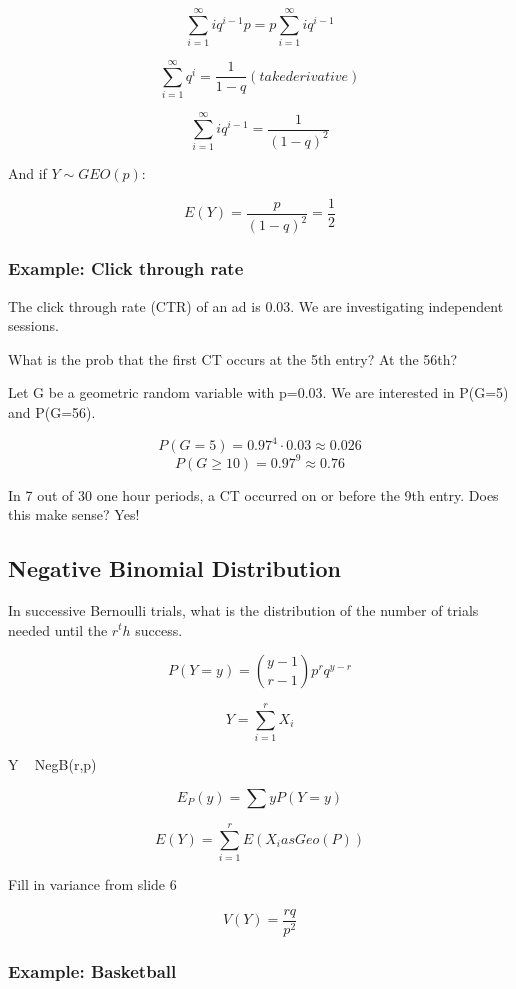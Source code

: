 \documentclass[a4paper]{article}
\begin{document}

\[
\sum_{i=1}^\infty i q^{i-1}p
=p\sum_{i=1}^\infty i q^{i-1}
\]

\[
\sum_{i=1}^\infty q^i=\frac{1}{1-q} (take derivative)
\]

\[
\sum_{i=1}^\infty iq^{i-1}=\frac{1}{(1-q)^2}
\]

And if $Y \sim GEO(p)$:

\[
E(Y)=\frac{p}{(1-q)^2}=\frac{1}{2}
\]

\subsubsection{Example: Click through rate}

The click through rate (CTR) of an ad is 0.03. We are investigating independent sessions.

What is the prob that the first CT occurs at the 5th entry? At the 56th?

Let G be a geometric random variable with p=0.03. We are interested in P(G=5) and P(G=56).

\[P(G=5)=0.97^4\cdot 0.03 \approx 0.026\]
\[P(G\ge10)=0.97^9 \approx 0.76\]

In 7 out of 30 one hour periods, a CT occurred on or before the 9th entry. Does this make sense? Yes!


\subsection{Negative Binomial Distribution}

In successive Bernoulli trials, what is the distribution of the number of trials needed until the $r^th$ success.

\[
P(Y=y)=\binom{y-1}{r-1}p^rq^{y-r}
\]

\[
Y=\sum_{i=1}^r X_i
\]

Y ~ NegB(r,p)

\[
E_P(y)=\sum yP(Y=y)
\]

\[
E(Y)=\sum_{i=1}^rE(X_i as Geo(P))
\]

Fill in variance from slide 6

\[
V(Y)=\frac{rq}{p^2}
\]

\subsubsection{Example: Basketball}
\end{document}
